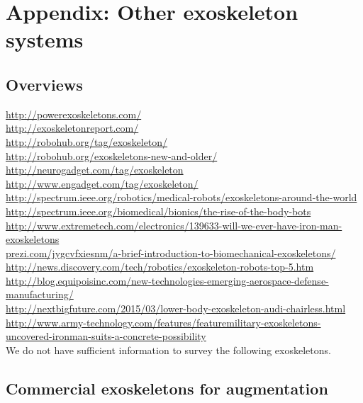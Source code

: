 
\section{Appendix: Other exoskeleton systems}

\subsection{Overviews}

\url{http://powerexoskeletons.com/}\\
\url{http://exoskeletonreport.com/}\\
\url{http://robohub.org/tag/exoskeleton/}\\
\url{http://robohub.org/exoskeletons-new-and-older/}\\
\url{http://neurogadget.com/tag/exoskeleton}\\
\url{http://www.engadget.com/tag/exoskeleton/}\\
\url{http://spectrum.ieee.org/robotics/medical-robots/exoskeletons-around-the-world}\\
\url{http://spectrum.ieee.org/biomedical/bionics/the-rise-of-the-body-bots}\\
\url{http://www.extremetech.com/electronics/139633-will-we-ever-have-iron-man-exoskeletons}\\
\url{prezi.com/jygcvfxiesnm/a-brief-introduction-to-biomechanical-exoskeletons/}\\
\url{http://news.discovery.com/tech/robotics/exoskeleton-robots-top-5.htm}\\
\url{http://blog.equipoisinc.com/new-technologies-emerging-aerospace-defense-manufacturing/}\\
\url{http://nextbigfuture.com/2015/03/lower-body-exoskeleton-audi-chairless.html}\\
\url{http://www.army-technology.com/features/featuremilitary-exoskeletons-uncovered-ironman-suits-a-concrete-possibility}\\


We do not have sufficient information to survey the following exoskeletons.\\


\subsection{Commercial exoskeletons for augmentation}


